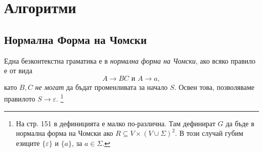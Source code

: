 \section{Алгоритми}

\subsection{Нормална Форма на Чомски}

\begin{dfn}
Една безконтекстна граматика е в {\em нормална форма на Чомски}, ако
всяко правило е от вида
\[A \rightarrow BC\mbox{ и }A \rightarrow a,\]
като $B, C$ {\em не могат} да бъдат променливата за начало $S$.
Освен това, позволяваме правилото $S\to\varepsilon$.
\footnote{На стр. 151 в \cite{papadimitriou} дефиницията е малко по-различна.
Там дефинират $G$ да бъде в нормална форма на Чомски ако $R \subseteq V\times(V\cup\Sigma)^2$.
В този случай губим езиците $\{\varepsilon\}$ и $\{a\}$, за $a\in\Sigma$.}
\end{dfn}

